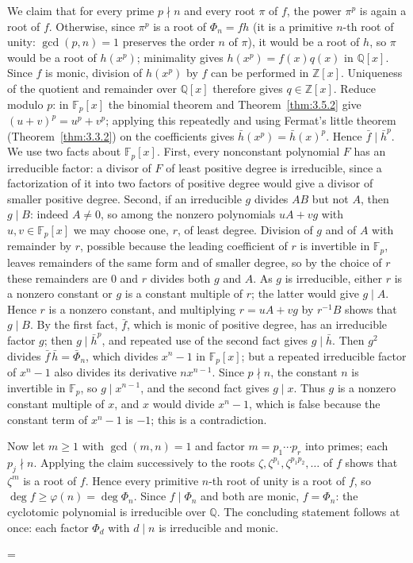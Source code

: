 \documentclass[11pt]{article}
\makeatletter
\theoremstyle{ntstyle}
\let\nt@closedisplay\]
\def\nt@guardedclose{\@ifnextchar\par{\nt@closeafterpar}{\@ifnextchar\end{\postdisplaypenalty\@M\nt@closedisplay}{\nt@closedisplay}}}
\def\nt@closeafterpar\par{\@ifnextchar\par{\nt@closeafterpar}{\@ifnextchar\end{\postdisplaypenalty\@M\nt@closedisplay\par}{\nt@closedisplay\par}}}
\renewenvironment{proof}[1][\proofname]{\par
  \pushQED{\qed}\normalfont\topsep\medskipamount\edef\nt@afterproof{\@endparpenalty=\the\@endparpenalty\relax}\@beginparpenalty\@M\@endparpenalty\@M\let\]\nt@guardedclose\trivlist\item[]\textit{#1\@addpunct{.}} \ignorespaces}{\ifvmode\addpenalty\@M\fi\popQED\nt@afterproof\endtrivlist\@endpefalse}
\makeatother
\begin{document}
\begin{proof}
	We claim that for every prime $p\nmid n$ and every root $\pi$ of $f$,
	the power $\pi^{p}$ is again a root of $f$. Otherwise, since $\pi^{p}$ is a
	root of $\Phi_n = fh$ (it is a primitive $n$-th root of unity:
	$\gcd(p, n) = 1$ preserves the order $n$ of $\pi$), it would be a
	root of $h$, so $\pi$ would be a root of $h(x^{p})$; minimality
	gives $h(x^{p})=f(x)q(x)$ in $\mathbb{Q}[x]$. Since $f$ is monic,
	division of $h(x^p)$ by $f$ can be performed in $\mathbb{Z}[x]$.
	Uniqueness of the quotient and remainder over $\mathbb{Q}[x]$ therefore
	gives $q\in\mathbb{Z}[x]$. Reduce modulo $p$:
	in $\mathbb{F}_p[x]$ the binomial theorem and
	Theorem~\ref{thm:3.5.2} give $(u+v)^p=u^p+v^p$; applying this repeatedly
	and using Fermat's little theorem (Theorem~\ref{thm:3.3.2}) on the
	coefficients gives $\bar h(x^{p}) = \bar h(x)^{p}$. Hence
	$\bar f\mid\bar h^{p}$. We use two facts about $\mathbb{F}_p[x]$.
	First, every nonconstant polynomial $F$ has an irreducible factor: a
	divisor of $F$ of least positive degree is irreducible, since a
	factorization of it into two factors of positive degree would give a
	divisor of smaller positive degree. Second, if an irreducible $g$
	divides $AB$ but not $A$, then $g\mid B$: indeed $A\neq0$, so among the
	nonzero polynomials $uA+vg$ with $u,v\in\mathbb{F}_p[x]$ we may choose
	one, $r$, of least degree. Division of $g$ and of $A$ with remainder by $r$, possible
	because the leading coefficient of $r$ is invertible in $\mathbb{F}_p$,
	leaves remainders of the same form and of smaller degree, so by the
	choice of $r$ these remainders are $0$ and $r$ divides both $g$ and $A$. As $g$ is
	irreducible, either $r$ is a nonzero constant or $g$ is a constant
	multiple of $r$; the latter would give $g\mid A$. Hence $r$ is a nonzero
	constant, and multiplying $r=uA+vg$ by $r^{-1}B$ shows that
	$g\mid B$. By the first fact, $\bar f$, which is monic of positive
	degree, has an irreducible factor $g$; then $g\mid\bar h^{p}$, and
	repeated use of the second fact gives $g\mid\bar h$. Then $g^2$
	divides $\bar f\,\bar h = \bar\Phi_n$, which divides $x^{n} - 1$ in
	$\mathbb{F}_p[x]$; but a repeated irreducible factor of $x^{n} - 1$
	also divides its derivative $nx^{n-1}$. Since $p\nmid n$, the constant
	$n$ is invertible in $\mathbb{F}_p$, so $g\mid x^{n-1}$, and the second
	fact gives $g\mid x$. Thus $g$ is a nonzero constant multiple of $x$,
	and $x$ would divide $x^n-1$, which is false because the constant
	term of $x^n-1$ is $-1$; this is a contradiction.

	Now let $m\ge1$ with $\gcd(m, n) = 1$ and factor $m = p_1\cdots p_r$
	into primes; each $p_j\nmid n$. Applying the claim successively to
	the roots $\zeta, \zeta^{p_1}, \zeta^{p_1p_2}, \ldots$ of $f$ shows
	that $\zeta^{m}$ is a root of $f$. Hence every primitive $n$-th root
	of unity is a root of $f$, so $\deg f\ge\varphi(n) = \deg\Phi_n$.
	Since $f\mid\Phi_n$ and both are monic, $f = \Phi_n$: the cyclotomic
	polynomial is irreducible over $\mathbb{Q}$. The concluding
	statement follows at once: each factor $\Phi_d$ with $d\mid n$ is
	irreducible and monic.

\end{proof}
\end{document}
